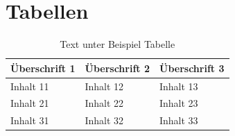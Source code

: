 \section{Tabellen} \label{hdl:konstrukte_tabellen}
\begin{table}[h]\footnotesize
\begin{center}
\begin{tabular}{ | p{3cm} | p{5cm} | p{5cm} |}
  \hline
    \textbf{Überschrift 1} & \textbf{Überschrift 2} & \textbf{Überschrift 3} \\
  \hline
    Inhalt 11 & Inhalt 12 & Inhalt 13 \\
  \hline
    Inhalt 21 & Inhalt 22 & Inhalt 23 \\
  \hline
    Inhalt 31 & Inhalt 32 & Inhalt 33 \\
  \hline
\end{tabular}
\caption[Kurzeintrag Verzeichnis Beispiel Tabelle]{Text unter Beispiel Tabelle} \label{tab:Beispieltabelle}
\end{center}
\end{table}
\clearpage

